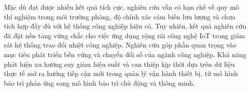 \documentclass[../main.tex]{subfiles}
\begin{document}
Mặc dù đạt được nhiều kết quả tích cực, nghiên cứu vẫn có hạn chế về quy mô thí nghiệm trong môi trường phòng, độ chính xác cảm biến lưu lượng và chưa tích hợp đầy đủ với hệ thống công nghiệp hiện có. Tuy nhiên, kết quả nghiên cứu đã đặt nền tảng vững chắc cho việc ứng dụng rộng rãi công nghệ IoT trong giám sát hệ thống trao đổi nhiệt công nghiệp. Nghiên cứu góp phần quan trọng vào mục tiêu phát triển bền vững và chuyển đổi số của ngành công nghiệp. Khả năng phát hiện xu hướng suy giảm hiệu suất và can thiệp kịp thời dựa trên dữ liệu thực tế mở ra hướng tiếp cận mới trong quản lý vận hành thiết bị, từ mô hình bảo trì phản ứng sang mô hình bảo trì chủ động và thông minh.
\end{document}
